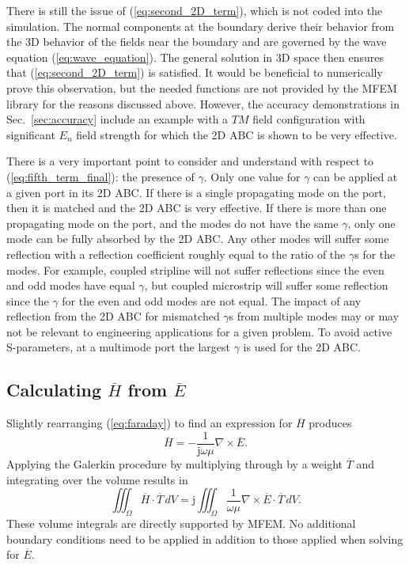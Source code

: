 \documentclass[titlepage]{article}
\renewcommand\_{\textunderscore\linebreak[1]}
\begin{document}
There is still the issue of (\ref{eq:second_2D_term}), which is not coded into the simulation. The normal components at the boundary derive their behavior from the 3D behavior of the fields near the boundary and are governed by the wave equation (\ref{eq:wave_equation}).  The general solution in 3D space then ensures that (\ref{eq:second_2D_term}) is satisfied.  It would be beneficial to numerically prove this observation, but the needed functions are not provided by the MFEM library for the reasons discussed above.  However, the accuracy demonstrations in Sec.~\ref{sec:accuracy} include an example with a $TM$ field configuration with significant $E_n$ field strength for which the 2D ABC is shown to be very effective.

There is a very important point to consider and understand with respect to (\ref{eq:fifth_term_final}): the presence of $\gamma$.  Only one value for $\gamma$ can be applied at a given port in its 2D ABC.  If there is a single propagating mode on the port, then it is matched and the 2D ABC is very effective.  If there is more than one propagating mode on the port, and the modes do not have the same $\gamma$, only one mode can be fully absorbed by the 2D ABC.  Any other modes will suffer some reflection with a reflection coefficient roughly equal to the ratio of the $\gamma$s for the modes.  For example, coupled stripline will not suffer reflections since the even and odd modes have equal $\gamma$, but coupled microstrip will suffer some reflection since the $\gamma$ for the even and odd modes are not equal.  The impact of any reflection from the 2D ABC for mismatched $\gamma$s from multiple modes may or may not be relevant to engineering applications for a given problem.  To avoid active S-parameters, at a multimode port the largest $\gamma$ is used for the 2D ABC.

\subsection{Calculating $\overline{H}$ from $\overline{E}$}

Slightly rearranging (\ref{eq:faraday}) to find an expression for $\overline{H}$ produces
\begin{equation}
\overline{H}=-\frac{1}{\text{j}\omega\mu}\nabla\times\overline{E}.
\end{equation}
Applying the Galerkin procedure by multiplying through by a weight $\overline{T}$ and integrating over the volume results in
\begin{equation}
\label{eq:Hfield}
\iiint_{\Omega}\overline{H}\cdot\overline{T}\, dV=\text{j}\iiint_{\Omega}\frac{1}{\omega\mu}\nabla\times\overline{E}\cdot\overline{T}\,dV.
\end{equation}
These volume integrals are directly supported by MFEM.  No additional boundary conditions need to be applied in addition to those applied when solving for $\overline{E}$.
\end{document}
